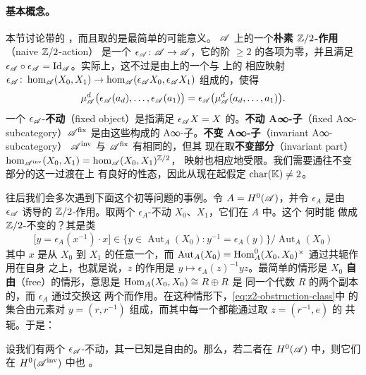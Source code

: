 \paragraph{基本概念。}\label{sub:z2-basic-notions}
本节讨论带\trInvolution{}的 \trACategory，而且取的是最简单的可能意义。
\trACategory{} $\mathscr{A}$ 上的一个\textbf{朴素 $\mathbb{Z}/2$-作用}（naive $\mathbb{Z}/2$-action）
是一个 \trAFunctor{} $\epsilon_{\mathscr{A}}\colon\mathscr{A}\to\mathscr{A}$，它的阶
$\ge 2$ 的各项为零，并且满足 $\epsilon_{\mathscr{A}}\circ\epsilon_{\mathscr{A}}
=\mathrm{Id}_{\mathscr{A}}$。实际上，这不过是由\trObject{}上的一个\trInvolution{}与%
\trMorphism{}上的
相应映射 $\epsilon_{\mathscr{A}}\colon\hom_{\mathscr{A}}(X_0,X_1)\to
\hom_{\mathscr{A}}(\epsilon_{\mathscr{A}}X_0,\epsilon_{\mathscr{A}}X_1)$ 组成的，使得
\begin{equation*}
\mu^d_{\mathscr{A}}\bigl(\epsilon_{\mathscr{A}}(a_d),\ldots,\epsilon_{\mathscr{A}}(a_1)\bigr)
=\epsilon_{\mathscr{A}}\bigl(\mu^d_{\mathscr{A}}(a_d,\ldots,a_1)\bigr).
\end{equation*}
一个 $\epsilon_{\mathscr{A}}$-\textbf{不动\trObject}（fixed object）是指满足
$\epsilon_{\mathscr{A}}X=X$ 的\trObject。\textbf{不动 A∞-子\trCategory}（fixed
A∞-subcategory）$\mathscr{A}^{\mathrm{fix}}$ 是由这些\trObject{}构成的\trFull{}
A∞-子\trCategory。\textbf{不变 A∞-子\trCategory}（invariant A∞-subcategory）
$\mathscr{A}^{\mathrm{inv}}$ 与 $\mathscr{A}^{\mathrm{fix}}$ 有相同的\trObject，但其%
\trMorphism{}现在取\textbf{不变部分}（invariant part）
$\hom_{\mathscr{A}^{\mathrm{inv}}}(X_0,X_1)=\hom_{\mathscr{A}}(X_0,X_1)^{\mathbb{Z}/2}$，%
\trComposition{}映射也相应地受限。我们需要通往不变部分的这一过渡在\trHomology{}上
有良好的性态，因此从现在起假定 $\operatorname{char}(\mathbb{K})\ne 2$。

往后我们会多次遇到下面这个初等问题的事例。令 $A=H^0(\mathscr{A})$，并令
$\epsilon_A$ 是由 $\epsilon_{\mathscr{A}}$ 诱导的 $\mathbb{Z}/2$-作用。取两个
$\epsilon_A$-不动\trObject{} $X_0$、$X_1$，它们在 $A$ 中\trIsomorphic。这个%
\trIsomorphism{}何时能
做成 $\mathbb{Z}/2$-不变的？其\trObstruction{}是类
\begin{equation}\label{eq:z2-obstruction-class}
\bigl[y=\epsilon_A(x^{-1})\cdot x\bigr]\in
\{y\in\operatorname{Aut}_A(X_0): y^{-1}=\epsilon_A(y)\}/\operatorname{Aut}_A(X_0)
\end{equation}
其中 $x$ 是从 $X_0$ 到 $X_1$ 的任意一个\trIsomorphism，而
$\operatorname{Aut}_A(X_0)=\operatorname{Hom}^0_A(X_0,X_0)^{\times}$ 通过\trTwisted{}共轭作用在自身
之上，也就是说，$z$ 的作用是 $y\mapsto\epsilon_A(z)^{-1}yz$。最简单的情形是
$X_0$ \textbf{自由}（free）的情形，意思是 $\operatorname{Hom}_A(X_0,X_0)\cong R\oplus R$ 是
同一个\trGraded{}代数 $R$ 的两个副本的\trDirectSum，而 $\epsilon_A$ 通过交换这
两个\trDirectSummand{}而作用。在这种情形下，\eqref{eq:z2-obstruction-class}中
的集合由元素对 $y=(r,r^{-1})$ 组成，而其中每一个都能通过取 $z=(r^{-1},e)$ 的%
\trTwisted{}共轭\trTrivialization。于是：

\begin{lemma}\label{thm:free-fixed-invariant-isomorphic}
设我们有两个 $\epsilon_{\mathscr{A}}$-不动\trObject，其一已知是自由的。那么，若二者在
$H^0(\mathscr{A})$ 中\trIsomorphic，则它们在 $H^0(\mathscr{A}^{\mathrm{inv}})$ 中也%
\trIsomorphic。
\noqed
\end{lemma}
